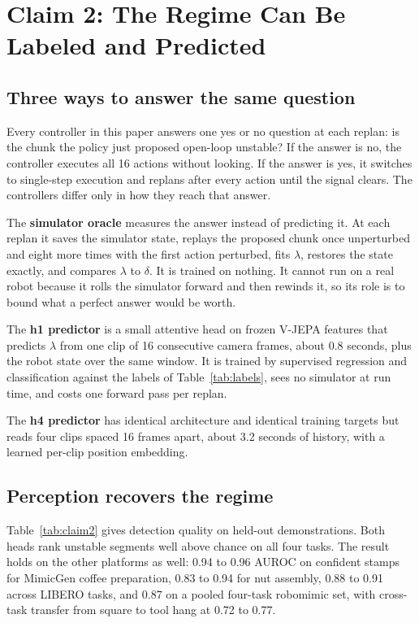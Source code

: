 \section{Claim 2: The Regime Can Be Labeled and Predicted}
\label{sec:claim2}

\subsection{Three ways to answer the same question}

Every controller in this paper answers one yes or no question at each replan:
is the chunk the policy just proposed open-loop unstable? If the answer is no,
the controller executes all 16 actions without looking. If the answer is yes,
it switches to single-step execution and replans after every action until the
signal clears. The controllers differ only in how they reach that answer.

The \textbf{simulator oracle} measures the answer instead of predicting it. At
each replan it saves the simulator state, replays the proposed chunk once
unperturbed and eight more times with the first action perturbed, fits
$\lambda$, restores the state exactly, and compares $\lambda$ to $\delta$. It
is trained on nothing. It cannot run on a real robot because it rolls the
simulator forward and then rewinds it, so its role is to bound what a perfect
answer would be worth.

The \textbf{h1 predictor} is a small attentive head on frozen V-JEPA features
that predicts $\lambda$ from one clip of 16 consecutive camera frames, about
0.8 seconds, plus the robot state over the same window. It is trained by
supervised regression and classification against the labels of
Table~\ref{tab:labels}, sees no simulator at run time, and costs one forward
pass per replan.

The \textbf{h4 predictor} has identical architecture and identical training
targets but reads four clips spaced 16 frames apart, about 3.2 seconds of
history, with a learned per-clip position embedding.

\subsection{Perception recovers the regime}

Table~\ref{tab:claim2} gives detection quality on held-out demonstrations. Both
heads rank unstable segments well above chance on all four tasks. The result
holds on the other platforms as well: 0.94 to 0.96 AUROC on confident stamps
for MimicGen coffee preparation, 0.83 to 0.94 for nut assembly, 0.88 to 0.91
across LIBERO tasks, and 0.87 on a pooled four-task robomimic set, with
cross-task transfer from square to tool hang at 0.72 to 0.77.

